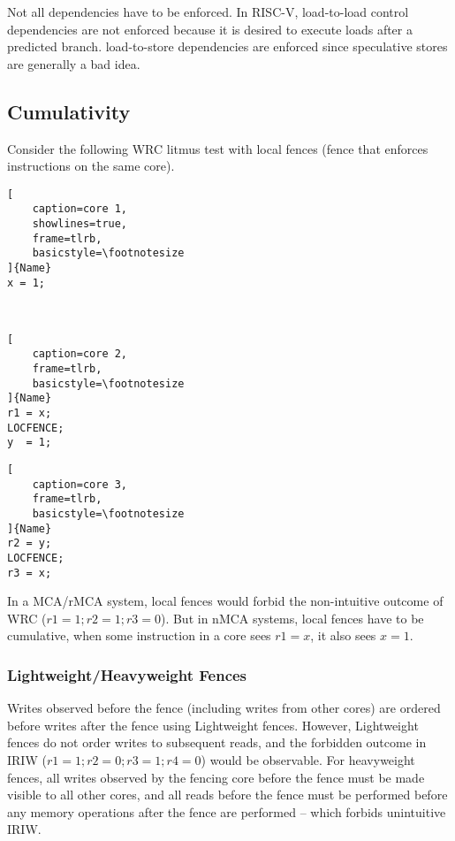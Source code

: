 \documentclass{article}
\begin{document}
\begin{multicols*}{2}
\noindent\newline
Not all dependencies have to be enforced. In RISC-V, load-to-load control dependencies are not enforced because it is desired to execute loads after a predicted branch. load-to-store dependencies are enforced since speculative stores are generally a bad idea.

\subsection{Cumulativity}
Consider the following WRC litmus test with local fences (fence that enforces instructions on the same core).

\noindent\begin{minipage}{.15\textwidth}
\captionsetup{labelformat=empty}
\begin{lstlisting}[
    caption=core 1,
    showlines=true,
    frame=tlrb, 
    basicstyle=\footnotesize
]{Name}
x = 1;

 
\end{lstlisting}
\end{minipage}\hfill
\begin{minipage}{.15\textwidth}
\captionsetup{labelformat=empty}
\begin{lstlisting}[
    caption=core 2,
    frame=tlrb,
    basicstyle=\footnotesize
]{Name}
r1 = x;
LOCFENCE;
y  = 1;
\end{lstlisting}
\end{minipage}\hfill
\begin{minipage}{.15\textwidth}
\captionsetup{labelformat=empty}
\begin{lstlisting}[
    caption=core 3,
    frame=tlrb,
    basicstyle=\footnotesize
]{Name}
r2 = y;
LOCFENCE;
r3 = x;
\end{lstlisting}
\end{minipage}

\noindent\newline
In a MCA/rMCA system, local fences would forbid the non-intuitive outcome of WRC ($r1=1; r2=1; r3=0$). But in nMCA systems, local fences have to be cumulative, when some instruction in a core sees $r1=x$, it also sees $x=1$.

\subsubsection{Lightweight/Heavyweight Fences}
Writes observed before the fence (including writes from other cores) are ordered before writes after the fence using Lightweight fences. However, Lightweight fences do not order writes to subsequent reads, and the forbidden outcome in IRIW ($r1=1; r2=0; r3=1; r4=0$) would be observable. 
\medskip\noindent\newline
For heavyweight fences, all writes observed by the fencing core before the fence must be made visible to all other cores, and all reads before the fence must be performed before any memory operations after the fence are performed -- which forbids unintuitive IRIW.


\end{multicols*}
\end{document}
